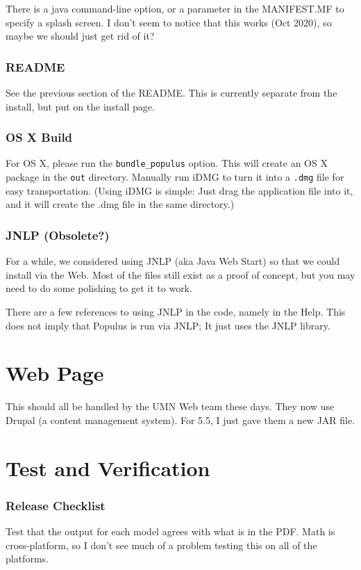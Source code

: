\documentclass[12pt]{article}
\begin{document}
There is a java command-line option, or a parameter in the MANIFEST.MF to specify a splash screen. I don't seem to notice that this works (Oct 2020), so maybe we should just get rid of it?

\section{README}
See the previous section of the README.  This is currently separate from the install, but put on the install page.

\section{OS X Build}
For OS X, please run the \texttt{bundle\_populus} option.  This will create an OS X package in the \texttt{out} directory.  Manually run iDMG to turn it into a \texttt{.dmg} file for easy transportation.  (Using iDMG is simple: Just drag the application file into it, and it will create the .dmg file in the same directory.)

\section{JNLP (Obsolete?)}
For a while, we considered using JNLP (aka Java Web Start) so that we could install via the Web.  Most of the files still exist as a proof of concept, but you may need to do some polishing to get it to work.

There are a few references to using JNLP in the code, namely in the Help.  This does not imply that Populus is run via JNLP;  It just uses the JNLP library.

\part{Web Page}

This should all be handled by the UMN Web team these days. They now use Drupal (a content management system).  For 5.5, I just gave them a new JAR file.

\part{Test and Verification}
\section{Release Checklist}

Test that the output for each model agrees with what is in the PDF.  Math is cross-platform, so I don't see much of a problem testing this on all of the platforms.
\end{document}

